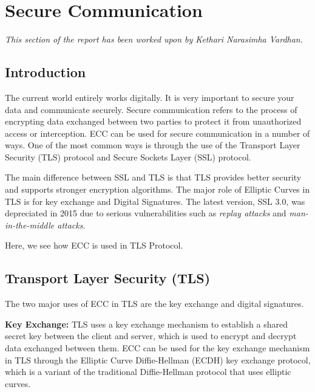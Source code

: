 \section{Secure Communication}
\textit{This section of the report has been worked upon by Kethari Narasimha Vardhan.}


\subsection{Introduction}
The current world entirely works digitally. It is very important to secure your data and communicate securely. Secure communication refers to the process of encrypting data exchanged between two parties to protect it from unauthorized access or interception. ECC can be used for secure communication in a number of ways. One of the most common ways is through the use of the Transport Layer Security (TLS) protocol and Secure Sockets Layer (SSL) protocol. \newline

\par
\noindent The main difference between SSL and TLS is that TLS provides better security and supports stronger encryption algorithms. The major role of Elliptic Curves in TLS is for key exchange and Digital Signatures. The latest version, SSL 3.0, was depreciated in 2015 due to serious vulnerabilities such as \textit{replay attacks} and \textit{man-in-the-middle attacks}. \newline

\par
\noindent Here, we see how ECC is used in TLS Protocol.

\subsection{Transport Layer Security (TLS)}

The two major uses of ECC in TLS are the key exchange and digital signatures. \newline

\par
\noindent\textbf{Key Exchange:} TLS uses a key exchange mechanism to establish a shared secret key between the client and server, which is used to encrypt and decrypt data exchanged between them. ECC can be used for the key exchange mechanism in TLS through the Elliptic Curve Diffie-Hellman (ECDH) key exchange protocol, which is a variant of the traditional Diffie-Hellman protocol that uses elliptic curves.

